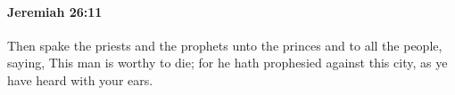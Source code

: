 
		\paragraph{Jeremiah 26:11} %
			\label{JEREMIAH-26-11}

			Then spake the priests and the prophets unto the princes and to all the people, saying, This man is worthy to die; for he hath prophesied against this city, as ye have heard with your ears.


